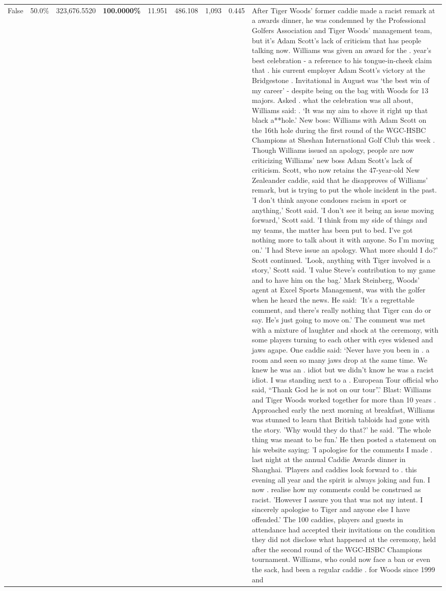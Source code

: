 \begin{table}[H]
\begin{tabular}{lllrlllll}
False & 50.0\% & 323,676.5520 & \bfseries \color{red} 100.0000\% & 11.951 & 486.108 & 1,093 & 0.445 & After Tiger Woods' former caddie made a racist remark at a awards dinner, he was condemned by the Professional Golfers Association and Tiger Woods' management team, but it's Adam Scott's lack of criticism that has people talking now. Williams was given an award for the . year’s best celebration - a reference to his tongue-in-cheek claim that . his current employer Adam Scott’s victory at the Bridgestone . Invitational in August was ‘the best win of my career’ - despite being on the bag with Woods for 13 majors. Asked . what the celebration was all about, Williams said: . ‘It was my aim to shove it right up that black a**hole.’ New boss: Williams with Adam Scott  on the 16th hole during the first round of the WGC-HSBC Champions at Sheshan International Golf Club this week . Though Williams issued an apology, people are now criticizing Williams' new boss Adam Scott's lack of criticism. Scott, who now retains the 47-year-old New Zealeander caddie, said that he disapproves of Williams' remark, but is trying to put the whole incident in the past. 'I don't think anyone condones racism in sport or anything,' Scott said. 'I don't see it being an issue moving forward,' Scott said. 'I think from my side of things and my teams, the matter has been put to bed. I've got nothing more to talk about it with anyone. So I'm moving on.' 'I had Steve issue an apology. What more should I do?' Scott continued. 'Look, anything with Tiger involved is a story,' Scott said. 'I value Steve's contribution to my game and to have him on the bag.' Mark Steinberg, Woods' agent at Excel Sports Management, was with the golfer when he heard the news. He said: 'It's a regrettable comment, and there's really nothing that Tiger can do or say. He's just going to move on.' The comment was met with a mixture of laughter and shock at the ceremony, with some players turning to each other with eyes widened and jaws agape. One caddie said: ‘Never have you been in . a room and seen so many jaws drop at the same time. We knew he was an . idiot but we didn’t know he was a racist idiot. I was standing next to a . European Tour official who said, “Thank God he is not on our tour”.’ Blast: Williams and Tiger Woods worked together for more than 10 years . Approached early the next morning at breakfast, Williams was stunned to learn that British tabloids had gone with the story. 'Why would they do that?' he said. 'The whole thing was meant to be fun.' He then posted a statement on his website saying: 'I apologise for the comments I made . last night at the annual Caddie Awards dinner in Shanghai. 'Players and caddies look forward to . this evening all year and the spirit is always joking and fun. I now . realise how my comments could be construed as racist. 'However I assure you that was not my intent. I sincerely apologise to Tiger and anyone else I have offended.' The 100 caddies, players and guests in attendance had accepted their invitations on the condition they did not disclose what happened at the ceremony, held after the second round of the WGC-HSBC Champions tournament. Williams, who could now face a ban or even the sack, had been a regular caddie . for Woods since 1999 and 
\end{tabular}
\end{table}
